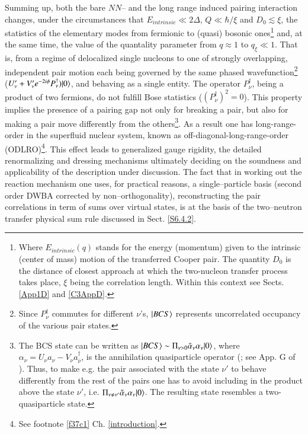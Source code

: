 \begin{subappendices}
Summing up, both the bare $NN$-- and the long range induced pairing interaction changes, under the circumstances that $E_{intrinsic}\ll2\Delta$, $Q\ll\hbar/\xi$ and $D_0\lesssim\xi$, the statistics of the elementary modes from fermionic to (quasi) bosonic ones\footnote{Where $E_{intrinsic}(q)$ stands for the energy (momentum) given to the intrinsic (center of mass) motion of the transferred Cooper pair. The quantity $D_0$ is the distance of closest approach at which the two-nucleon transfer process takes place, $\xi$ being the correlation length. Within this context see Sects. \ref{App1D} and \ref{C3AppD}.} and, at the same time, the value of the quantality parameter from $q\approx1$ to $q_\xi\ll 1$. That is,   from a regime of delocalized single nucleons to one of strongly overlapping, independent pair motion each being governed by the same phased wavefunction\footnote{Since $P^\dagger_\nu$ commutes for different $\nu$'s, $|{BCS} \rangle$ represents uncorrelated occupancy of the various pair states.} ($U'_{\nu}+V'_{\nu}e^{-2i\phi}P^\dagger_\nu)|{0} \rangle$, and behaving as a single entity. The operator $P^\dagger_\nu$, being a product of two fermions, do not fulfill Bose statistics ($(P^\dagger_\nu)^2=0$). This property implies the presence of a pairing gap not only for breaking a pair, but also for making a pair move differently from the others\footnote{The BCS state can be written as $|{BCS} \rangle\sim\Pi_{\nu>0} \bar\alpha_\nu\alpha_\nu|{0} \rangle$, where $\alpha_\nu=U_\nu a_\nu-V_\nu a^\dagger_{\bar{\nu}}$, is the annihilation quasiparticle operator (\cite{Bogoljubov:58,Valatin:58}; see App. G of \cite{Brink:05}). Thus, to make e.g. the pair associated with the state $\nu'$ to behave differently from the rest of the pairs one has to avoid including in the product above the state $\nu'$, i.e. $\Pi_{\nu\neq\nu'} \tilde\alpha_\nu\alpha_\nu|{0} \rangle$. The resulting state resembles a two-quasiparticle state.}. As a result one has long-range-order in the superfluid nuclear system, known as off-diagonal-long-range-order (ODLRO)\footnote{See footnote \ref{f37c1} Ch. \ref{introduction}.}.  This effect leads  to  generalized gauge rigidity, the detailed renormalizing and dressing mechanisms ultimately deciding on the soundness and applicability of the description under discussion. The fact that in working out the reaction mechanism one uses, for practical reasons, a single--particle basis (second order DWBA corrected by non--orthogonality), reconstructing the pair correlations in term of sums over virtual states, is at the basis of the two--neutron transfer physical sum rule discussed in Sect. \ref{S6.4.2}.
 

\end{subappendices}
